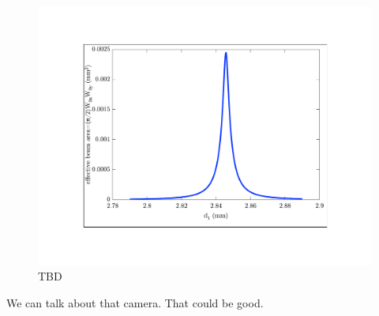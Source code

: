 \begin{figure}
    \centerline{\includegraphics{waists2}}
    \caption[]{\label{fig:typicaldata}
    TBD}
\end{figure}




We can talk about that camera. That could be good. %
